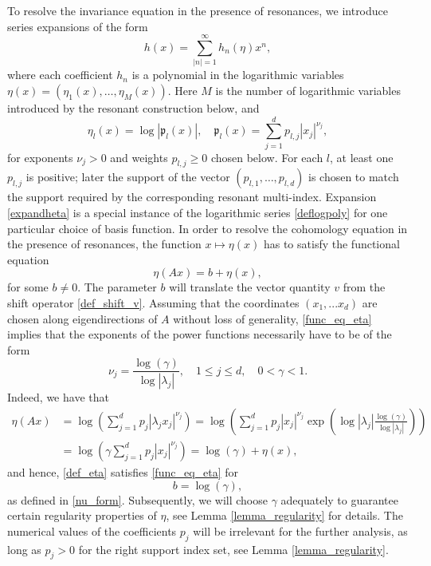 \documentclass{amsart}
\theoremstyle{plain}
\theoremstyle{definition}
\begin{document}
To resolve the invariance equation in the presence of resonances, we introduce series expansions of the form
\begin{equation}\label{expandheta}
    h(x) = \sum_{|n|=1}^\infty h_n(\eta) x^n,
\end{equation}
where each coefficient $h_n$ is a polynomial in the logarithmic variables $\eta(x)=(\eta_1(x),\ldots,\eta_M(x))$. Here $M$ is the number of logarithmic variables introduced by the resonant construction below, and
\begin{equation}\label{def_eta}
    \eta_l(x) = \log |\mathfrak{p}_l(x)|,\quad \mathfrak{p}_l(x) = \sum_{j=1}^d p_{l,j}|x_j|^{\nu_j},
\end{equation}
for exponents $\nu_j>0$ and weights $p_{l,j}\geq0$ chosen below. For each $l$, at least one $p_{l,j}$ is positive; later the support of the vector $(p_{l,1},\ldots,p_{l,d})$ is chosen to match the support required by the corresponding resonant multi-index.
Expansion \eqref{expandheta} is a special instance of the logarithmic series \eqref{deflogpoly} for one particular choice of basis function. In order to resolve the cohomology equation in the presence of resonances, the function $x\mapsto \eta(x)$ has to satisfy the functional equation
\begin{equation}\label{func_eq_eta}
    \eta(Ax) = b + \eta(x),
\end{equation}
for some $b\neq 0$. The parameter $b$ will translate the vector quantity $v$ from the shift operator \eqref{def_shift_v}. Assuming that the coordinates $(x_1,...x_d)$ are chosen along eigendirections of $A$ without loss of generality, \eqref{func_eq_eta} implies that the exponents of the power functions necessarily have to be of the form
\begin{equation}\label{nu_form}
    \nu_j = \frac{\log(\gamma)}{\log|\lambda_j|},\quad 1\leq j\leq d,\quad 0<\gamma<1. 
\end{equation}
Indeed, we have that 
\begin{equation}
\begin{split}
    \eta(Ax) & = \log\left(\sum_{j=1}^d p_j|\lambda_j x_j|^{\nu_j}\right) =  \log\left(\sum_{j=1}^d p_j | x_j|^{\nu_j} \exp\left(\log|\lambda_j|\frac{\log(\gamma)}{\log|\lambda_j|}\right)\right)\\
    & = \log\left(\gamma\sum_{j=1}^d p_j| x_j|^{\nu_j}\right) = \log(\gamma) + \eta(x),
    \end{split}
\end{equation}
and hence, \eqref{def_eta} satisfies \eqref{func_eq_eta} for
\begin{equation}\label{defvlambda}
b = \log(\gamma),
\end{equation}
as defined in \eqref{nu_form}. Subsequently, we will choose $\gamma$ adequately to guarantee certain regularity properties of $\eta$, see Lemma \ref{lemma_regularity} for details. The numerical values of the coefficients $p_j$ will be irrelevant for the further analysis, as long as $p_j>0$ for the right support index set, see Lemma \ref{lemma_regularity}. 
\end{document}
